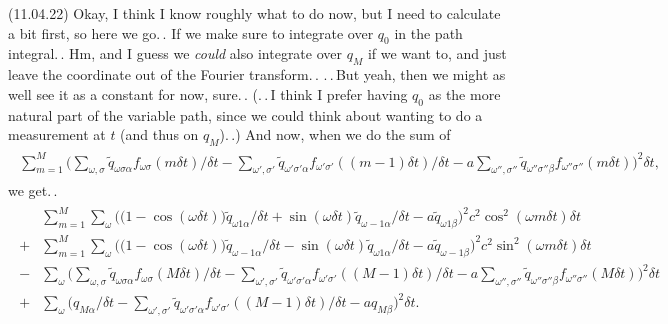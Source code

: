 \documentclass{report}
\begin{document}
(11.04.22) Okay, I think I know roughly what to do now, but I need to calculate a bit first, so here we go.\,. If we make sure to integrate over $q_0$ in the path integral.\,. Hm, and I guess we \emph{could} also integrate over $q_M$ if we want to, and just leave the coordinate out of the Fourier transform.\,. .\,.\,But yeah, then we might as well see it as a constant for now, sure.\,. (.\,.\,I think I prefer having $q_0$ as the more natural part of the variable path, since we could think about wanting to do a measurement at $t$ (and thus on $q_M$).\,.) And now, when we do the sum of 
\begin{align}
\begin{aligned}
	\sum_{m=1}^{M}
		\bigg( 
			\sum_{\omega, \sigma} 
				\tilde q_{\omega\sigma\alpha}
				f_{\omega \sigma}(m\delta t) 
				/ \delta t 
			- 
			\sum_{\omega', \sigma'} 
				\tilde q_{\omega'\sigma'\alpha}
				f_{\omega' \sigma'}((m-1) \delta t) 
			 	/ \delta t 
			- 
			a \sum_{\omega'', \sigma''} 
				\tilde q_{\omega''\sigma''\beta}
				f_{\omega'' \sigma''}(m \delta t) 
		\bigg)^2 
		\delta t,
\end{aligned}
\end{align}
we get.\,.
\begin{align}
\begin{aligned}
	&\sum_{m=1}^{M} \sum_{\omega}
		\Big(
			\big(1 - \cos(\omega\delta t)\big) \tilde q_{\omega 1\alpha}  / \delta t +
			\sin(\omega\delta t) \tilde q_{\omega-1\alpha} / \delta t -
			a \tilde q_{\omega 1\beta}
		\Big)^2 
		c^2 \cos^2(\omega m \delta t)
		\delta t\\
	+&\sum_{m=1}^{M} \sum_{\omega}
		\Big(
			\big(1 - \cos(\omega\delta t)\big) \tilde q_{\omega-1\alpha}  / \delta t -
			\sin(\omega\delta t) \tilde q_{\omega 1\alpha} / \delta t -
			a \tilde q_{\omega-1\beta}
		\Big)^2 
		c^2 \sin^2(\omega m \delta t)
		\delta t\\
	-&\sum_{\omega}
		\bigg( 
			\sum_{\omega, \sigma} 
				\tilde q_{\omega\sigma\alpha}
				f_{\omega \sigma}(M\delta t) 
				/ \delta t 
			- 
			\sum_{\omega', \sigma'} 
				\tilde q_{\omega'\sigma'\alpha}
				f_{\omega' \sigma'}((M-1) \delta t) 
			 	/ \delta t 
			- 
			a \sum_{\omega'', \sigma''} 
				\tilde q_{\omega''\sigma''\beta}
				f_{\omega'' \sigma''}(M \delta t) 
		\bigg)^2 
		\delta t\\
	+&\sum_{\omega}
		\bigg( 
			q_{M\alpha}	/ \delta t 
			- 
			\sum_{\omega', \sigma'} 
				\tilde q_{\omega'\sigma'\alpha}
				f_{\omega' \sigma'}((M-1) \delta t) 
			 	/ \delta t 
			- 
			a q_{M\beta}
		\bigg)^2 
		\delta t.
	\label{eq_3.68}
\end{aligned}
\end{align}
\end{document}
